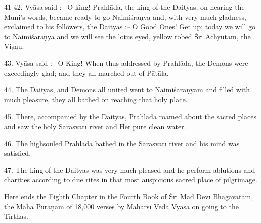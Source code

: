 41-42. Vy\=asa said :-- O king! Prahl\=ada, the king of the Daityas, on hearing the Muni's words, became ready to go Naimi\'sra\d{n}ya and, with very much gladness, exclaimed to his followers, the Daityas :-- O Good Ones! Get up; today we will go to Naimi\'s\=ara\d{n}ya and we will see the lotus eyed, yellow robed \'Sr\={\i} Achyutam, the Vi\d{s}\d{n}u.

43. Vy\=asa said :-- O King! When thus addressed by Prahl\=ada, the Demons were exceedingly glad; and they all marched out of P\=at\=ala.

44. The Daityas, and Demons all united went to Naimi\'s\=ara\d{n}yam and filled with much pleasure, they all bathed on reaching that holy place.

45. There, accompanied by the Daityas, Prahl\=ada roamed about the sacred places and saw the holy Sarasvat\={\i} river and Her pure clean water.

46. The highsouled Prahl\=ada bathed in the Sarasvat\={\i} river and his mind was satisfied.

47. The king of the Daityas was very much pleased and he perform ablutions and charities according to due rites in that most auspicious sacred place of pilgrimage.

Here ends the Eighth Chapter in the Fourth Book of \'Sr\={\i} Mad Dev\={\i} Bh\=agavatam, the Mah\=a Pur\=a\d{n}am of 18,000 verses by Mahar\d{s}\={\i} Veda Vy\=asa on going to the T\={\i}rthas.



